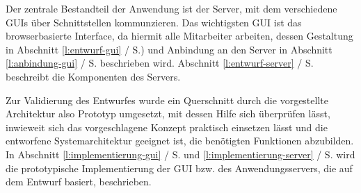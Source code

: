 Der zentrale Bestandteil der Anwendung ist der Server, mit dem verschiedene GUIs über Schnittstellen kommunzieren. Das wichtigsten GUI ist das browserbasierte Interface, da hiermit alle Mitarbeiter arbeiten, dessen Gestaltung in Abschnitt \ref{l:entwurf-gui} / S.\pageref{l:entwurf-gui}) und Anbindung an den Server in Abschnitt \ref{l:anbindung-gui} / S.\pageref{l:anbindung-gui} beschrieben wird. Abschnitt \ref{l:entwurf-server} / S.\pageref{l:entwurf-server} beschreibt die Komponenten des Servers. 

Zur Validierung des Entwurfes wurde ein Querschnitt durch die vorgestellte Architektur also Prototyp umgesetzt, mit dessen Hilfe sich überprüfen lässt, inwieweit sich das vorgeschlagene Konzept praktisch einsetzen lässt und die entworfene Systemarchitektur geeignet ist, die benötigten Funktionen abzubilden. In Abschnitt \ref{l:implementierung-gui} / S.\pageref{l:implementierung-gui} und \ref{l:implementierung-server} / S.\pageref{l:implementierung-server} wird die prototypische Implementierung der GUI bzw. des Anwendungsservers, die auf dem Entwurf basiert, beschrieben.

















\pagebreak
